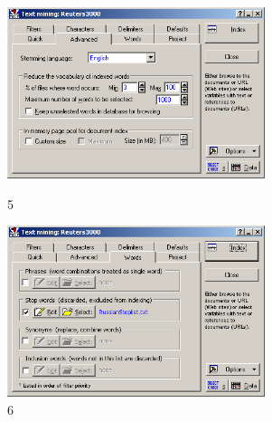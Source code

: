 \begin{figure}[!h]
  \centering

  \begin{minipage}{0.49\textwidth}
    \centering

    \includegraphics[height=5cm]
    {inc/5.PNG}

    \caption{5}

    \label{fig:5}
  \end{minipage}
  \begin{minipage}{0.49\textwidth}
    \centering

    \includegraphics[height=5cm]
    {inc/6.PNG}

    \caption{6}

    \label{fig:6}
  \end{minipage}
\end{figure}

